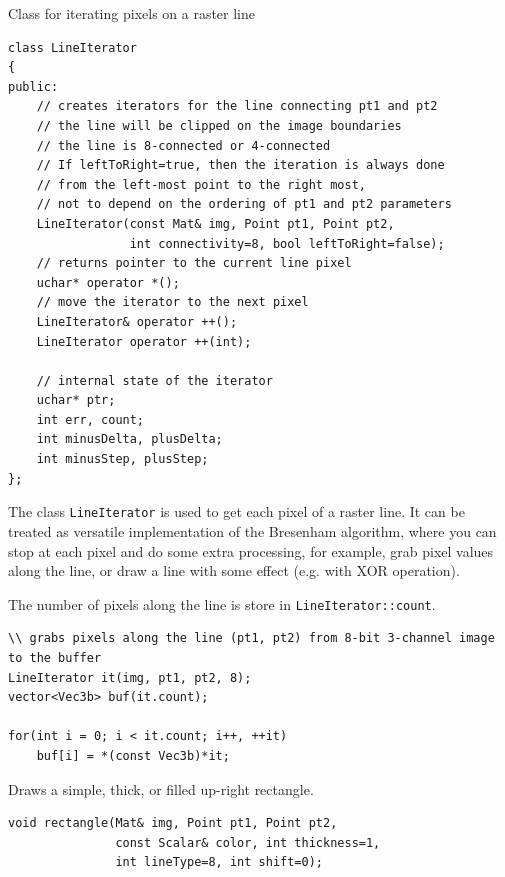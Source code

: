 \label{LineIterator}
Class for iterating pixels on a raster line

\begin{lstlisting}
class LineIterator
{
public:
    // creates iterators for the line connecting pt1 and pt2
    // the line will be clipped on the image boundaries
    // the line is 8-connected or 4-connected
    // If leftToRight=true, then the iteration is always done
    // from the left-most point to the right most,
    // not to depend on the ordering of pt1 and pt2 parameters
    LineIterator(const Mat& img, Point pt1, Point pt2,
                 int connectivity=8, bool leftToRight=false);
    // returns pointer to the current line pixel
    uchar* operator *();
    // move the iterator to the next pixel
    LineIterator& operator ++();
    LineIterator operator ++(int);

    // internal state of the iterator
    uchar* ptr;
    int err, count;
    int minusDelta, plusDelta;
    int minusStep, plusStep;
};
\end{lstlisting}

The class \texttt{LineIterator} is used to get each pixel of a raster line. It can be treated as versatile implementation of the Bresenham algorithm, where you can stop at each pixel and do some extra processing, for example, grab pixel values along the line, or draw a line with some effect (e.g. with XOR operation).

The number of pixels along the line is store in \texttt{LineIterator::count}.

\begin{lstlisting}
\\ grabs pixels along the line (pt1, pt2) from 8-bit 3-channel image to the buffer
LineIterator it(img, pt1, pt2, 8);
vector<Vec3b> buf(it.count);

for(int i = 0; i < it.count; i++, ++it)
    buf[i] = *(const Vec3b)*it;
\end{lstlisting}


\label{rectangle}
Draws a simple, thick, or filled up-right rectangle.

\begin{lstlisting}
void rectangle(Mat& img, Point pt1, Point pt2,
               const Scalar& color, int thickness=1,
               int lineType=8, int shift=0);
\end{lstlisting}
\begin{description}
\end{description}

